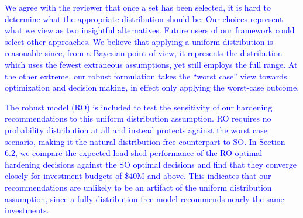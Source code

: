 \documentclass[authoryear,preprint,review,12pt]{elsarticle}\usepackage{amssymb}
\begin{document}
\textcolor{blue}{We agree with the reviewer that once a set has been selected, it is hard to determine what the appropriate distribution should be. Our choices represent what we view as two insightful alternatives. Future users of our framework could select other approaches. We believe that applying a uniform distribution is reasonable since, from a Bayesian point of view, it represents the distribution which uses the fewest extraneous assumptions, yet still employs the full range. At the other extreme, our robust formulation takes the ``worst case'' view towards optimization and decision making, in effect only applying the worst-case outcome.}



\textcolor{blue}{The robust model (RO) is included to test the sensitivity of our hardening recommendations to this uniform distribution assumption. RO requires no probability distribution at all and instead protects against the worst case scenario, making it the natural distribution free counterpart to SO. In Section 6.2, we compare the expected load shed performance of the RO optimal hardening decisions against the SO optimal decisions and find that they converge closely for investment budgets of \$40M and above. 
This indicates that our recommendations are unlikely to be an artifact of the uniform distribution assumption, since a fully distribution free model recommends nearly the same investments. }
\end{document}
